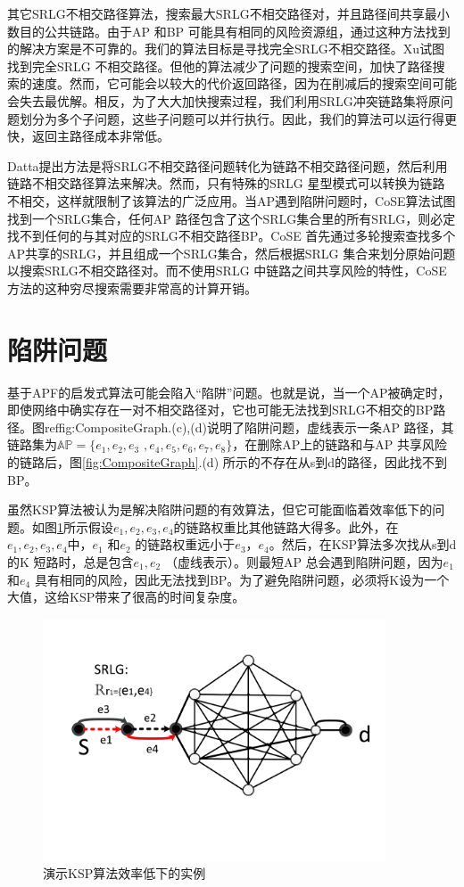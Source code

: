 其它SRLG不相交路径算法\cite{rostami2012msdp,rostami2007cose,datta2008graph,xu2003new,todimala2004imsh}，搜索最大SRLG不相交路径对，并且路径间共享最小数目的公共链路。由于AP 和BP 可能具有相同的风险资源组，通过这种方法找到的解决方案是不可靠的。我们的算法目标是寻找完全SRLG不相交路径。Xu\cite{xu2003trap}试图找到完全SRLG 不相交路径。但他的算法减少了问题的搜索空间，加快了路径搜索的速度。然而，它可能会以较大的代价返回路径，因为在削减后的搜索空间可能会失去最优解。相反，为了大大加快搜索过程，我们利用SRLG冲突链路集将原问题划分为多个子问题，这些子问题可以并行执行。因此，我们的算法可以运行得更快，返回主路径成本非常低。

Datta\cite{datta2008graph}提出方法是将SRLG不相交路径问题转化为链路不相交路径问题，然后利用链路不相交路径算法来解决。然而，只有特殊的SRLG 星型模式可以转换为链路不相交，这样就限制了该算法的广泛应用。当AP遇到陷阱问题时，CoSE\cite{rostami2007cose}算法试图找到一个SRLG集合，任何AP 路径包含了这个SRLG集合里的所有SRLG，则必定找不到任何的与其对应的SRLG不相交路径BP。CoSE 首先通过多轮搜索查找多个AP共享的SRLG，并且组成一个SRLG集合，然后根据SRLG 集合来划分原始问题以搜索SRLG不相交路径对。而不使用SRLG 中链路之间共享风险的特性，CoSE方法的这种穷尽搜索需要非常高的计算开销。



\section{陷阱问题}
\label{sec:trapproblem}
基于APF的启发式算法可能会陷入“陷阱”问题。也就是说，当一个AP被确定时，即使网络中确实存在一对不相交路径对，它也可能无法找到SRLG不相交的BP路径。图ref{fig:CompositeGraph}.(c),(d)说明了陷阱问题，虚线表示一条AP 路径，其链路集为$\mathbb{AP}=\{e_1,e_2,e_3$ $,e_4,e_5,e_6,e_7,e_8\}$，在删除AP上的链路和与AP 共享风险的链路后，图\ref{fig:CompositeGraph}.(d) 所示的不存在从s到d的路径，因此找不到BP。

虽然KSP算法被认为是解决陷阱问题的有效算法，但它可能面临着效率低下的问题。如图\ref{fig:KSPproblem}所示假设$e_1, e_2, e_3, e_4$的链路权重比其他链路大得多。此外，在$e_1, e_2, e_3, e_4$中，$e_1$ 和$e_2$ 的链路权重远小于$e_3$，$e_4$。然后，在KSP算法多次找从s到d的K 短路时，总是包含$e_1,e_2$ （虚线表示）。则最短AP 总会遇到陷阱问题，因为$e_1$和$e_4$ 具有相同的风险，因此无法找到BP。为了避免陷阱问题，必须将K设为一个大值，这给KSP带来了很高的时间复杂度。
\begin{figure}[htbp]
\centering
\includegraphics[width=4.0in]{figures/KSPproblem}
  \caption{演示KSP算法效率低下的实例}
  \label{fig:KSPproblem}
\end{figure}


